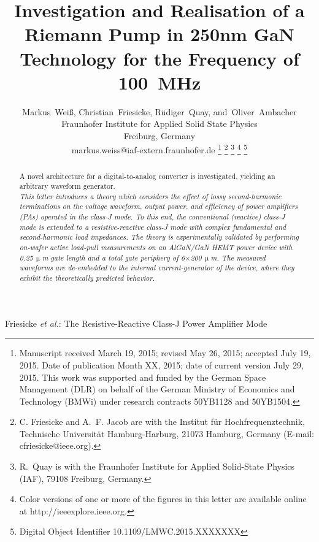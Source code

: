 \documentclass[journal]{IEEEtran}
\newcommand{\boldum}{\,\boldmath$\upmu$m\xspace}  %
\begin{document}
\title{Investigation and Realisation of a Riemann Pump in 250nm GaN Technology for the Frequency of \SI{100}{\MHz}}

\author{%
	Markus~Wei\ss{},
    Christian~Friesicke,
    R\"{u}diger~Quay,
    and~Oliver~Ambacher\\
    Fraunhofer Institute for Applied Solid State Physics\\
    Freiburg, Germany\\
    markus.weiss@iaf-extern.fraunhofer.de%
    \thanks{%
      Manuscript received March 19, 2015;
      revised May 26, 2015;
      accepted July 19, 2015.
      Date of publication Month XX, 2015;
      date of current version July 29, 2015.
      This work was supported and funded by the German Space Management
      (DLR) on behalf of the German Ministry of Economics and Technology (BMWi)
      under research contracts 50YB1128 and 50YB1504.%
    }%
    \thanks{
      C. Friesicke and A.~F. Jacob are with the Institut f\"{u}r
      Hochfrequenztechnik, Technische Universit\"{a}t Hamburg-Harburg, 21073
      Hamburg, Germany (E-mail: cfriesicke@ieee.org).%
    }%
    \thanks{R.~Quay is with the Fraunhofer Institute for Applied Solid-State
      Physics (IAF), 79108 Freiburg, Germany.%
    }%
    \thanks{%
      Color versions of one or more of the figures in this letter are available
      online at http://ieeexplore.ieee.org.}
    \thanks{%
      Digital Object Identifier 10.1109/LMWC.2015.XXXXXXX%
    }%
}

%
         {Friesicke \MakeLowercase{\textit{et al.}}:
          The Resistive-Reactive Class-J Power Amplifier Mode}

\maketitle



\begin{abstract}

A novel architecture for a digital-to-analog converter is investigated, yielding an arbitrary waveform generator.\\%
\textit{This letter introduces a theory which considers the effect of lossy
second-harmonic terminations on the voltage waveform, output power, and
efficiency of power amplifiers (PAs) operated in the class-J mode. To this end,
the conventional (reactive) class-J mode is extended to a resistive-reactive
class-J mode with complex fundamental and second-harmonic load impedances.
The theory is experimentally validated by performing on-wafer active load-pull
measurements on an AlGaN/GaN HEMT power device with 0.25\boldum gate length and
a total gate periphery of 6$\times$200\boldum. The measured waveforms are
de-embedded to the internal current-generator of the device, where they exhibit
the theoretically predicted behavior.}

\end{abstract}
\end{document}
